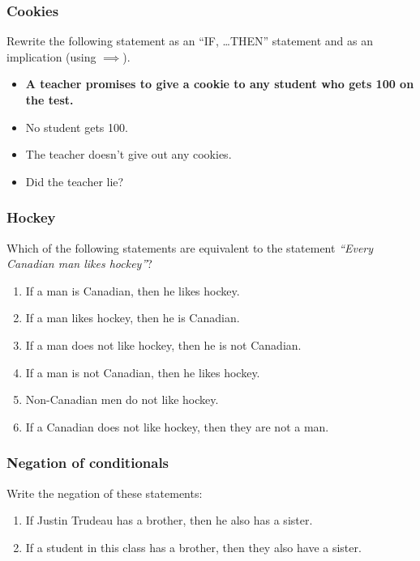 \documentclass[14pt]{beamer}
\newcommand{\p}{\pause}
\begin{document}

\begin{frame}
\frametitle{ Cookies }


	Rewrite the following statement as an ``IF, \ldots THEN'' statement and as an implication (using $\implies$). 
	\begin{itemize}
		\item \textbf{A teacher promises to give a cookie to any student who gets 100 on the test.}
		\bigskip\p
		\item No student gets 100.
		\item The teacher doesn't give out any cookies.
		\vfill
		\item Did the teacher lie?
	\end{itemize}

\vfill

\end{frame}

\begin{frame}
\frametitle{Hockey}

Which of the following statements are equivalent to the statement \quad
\emph{``Every Canadian man likes hockey''}? 

	\begin{enumerate}
		\item  If a man is Canadian, then he likes hockey.
		\item  If a man likes hockey, then he is Canadian.
		\item  If a man does not like hockey, then he is not Canadian.
		\item  If a man is not Canadian, then he likes hockey.
		\item  Non-Canadian men do not like hockey.
		\item  If a Canadian does not like hockey, then they are not a man.
	\end{enumerate}
\end{frame}


\begin{frame}
\frametitle{Negation of conditionals}

Write the negation of these statements:
	\begin{enumerate}
		\item  If Justin Trudeau has a brother, then he also has a sister.
		\item  If a student in this class has a brother, then they also have a sister.
	\end{enumerate}	
\end{frame}
\end{document}
